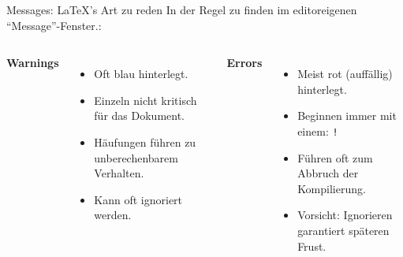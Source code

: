 \documentclass["WS\space 16-17\space -\space LaTeX-Kurs\space -\space Praesentation\space -\space 4.tex"]{subfiles}
\begin{document}
\begin{frame}{Messages: {\LaTeX}'s Art zu reden}
    In der Regel zu finden im editoreigenen ``Message''-Fenster.\vspace{10pt}:
    \begin{columns}

      {\color{blue}\textbf{Warnings}}
      \begin{itemize}
      \item<2-> Oft blau hinterlegt.
      \item<4-> Einzeln nicht kritisch für das Dokument.
      \item<7-> Häufungen führen zu unberechenbarem Verhalten.
      \item<7-> Kann oft ignoriert werden.
      \end{itemize}

      {\color{red}\textbf{Errors}}
      \begin{itemize}
      \item<3-> Meist rot (auffällig) hinterlegt.
      \item<3-> Beginnen immer mit einem: {\color{red}\texttt{!}}
      \item<5-> Führen oft zum Abbruch der Kompilierung.
      \item<8-> Vorsicht: Ignorieren garantiert späteren Frust.
      \end{itemize}
      
    \end{columns}

    \vspace{10pt}
\end{frame}
\end{document}

